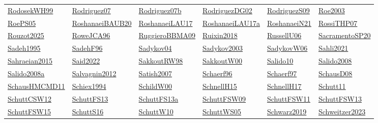\begin{longtable}{*{6}{l}}
\hyperref[detail:RodosekWH99]{RodosekWH99} & \hyperref[detail:Rodriguez07]{Rodriguez07} & \hyperref[detail:Rodriguez07b]{Rodriguez07b} & \hyperref[detail:RodriguezDG02]{RodriguezDG02} & \hyperref[detail:RodriguezS09]{RodriguezS09} & \hyperref[detail:Roe2003]{Roe2003}\\ 
\hyperref[detail:RoePS05]{RoePS05} & \hyperref[detail:RoshanaeiBAUB20]{RoshanaeiBAUB20} & \hyperref[detail:RoshanaeiLAU17]{RoshanaeiLAU17} & \hyperref[detail:RoshanaeiLAU17a]{RoshanaeiLAU17a} & \hyperref[detail:RoshanaeiN21]{RoshanaeiN21} & \hyperref[detail:RossiTHP07]{RossiTHP07}\\ 
\hyperref[detail:Rouzot2025]{Rouzot2025} & \hyperref[detail:RoweJCA96]{RoweJCA96} & \hyperref[detail:RuggieroBBMA09]{RuggieroBBMA09} & \hyperref[detail:Ruixin2018]{Ruixin2018} & \hyperref[detail:RussellU06]{RussellU06} & \hyperref[detail:SacramentoSP20]{SacramentoSP20}\\ 
\hyperref[detail:Sadeh1995]{Sadeh1995} & \hyperref[detail:SadehF96]{SadehF96} & \hyperref[detail:Sadykov04]{Sadykov04} & \hyperref[detail:Sadykov2003]{Sadykov2003} & \hyperref[detail:SadykovW06]{SadykovW06} & \hyperref[detail:Sahli2021]{Sahli2021}\\ 
\hyperref[detail:Sahraeian2015]{Sahraeian2015} & \hyperref[detail:Said2022]{Said2022} & \hyperref[detail:SakkoutRW98]{SakkoutRW98} & \hyperref[detail:SakkoutW00]{SakkoutW00} & \hyperref[detail:Salido10]{Salido10} & \hyperref[detail:Salido2008]{Salido2008}\\ 
\hyperref[detail:Salido2008a]{Salido2008a} & \hyperref[detail:Salvagnin2012]{Salvagnin2012} & \hyperref[detail:Satish2007]{Satish2007} & \hyperref[detail:Schaerf96]{Schaerf96} & \hyperref[detail:Schaerf97]{Schaerf97} & \hyperref[detail:SchausD08]{SchausD08}\\ 
\hyperref[detail:SchausHMCMD11]{SchausHMCMD11} & \hyperref[detail:Schiex1994]{Schiex1994} & \hyperref[detail:SchildW00]{SchildW00} & \hyperref[detail:SchnellH15]{SchnellH15} & \hyperref[detail:SchnellH17]{SchnellH17} & \hyperref[detail:Schutt11]{Schutt11}\\ 
\hyperref[detail:SchuttCSW12]{SchuttCSW12} & \hyperref[detail:SchuttFS13]{SchuttFS13} & \hyperref[detail:SchuttFS13a]{SchuttFS13a} & \hyperref[detail:SchuttFSW09]{SchuttFSW09} & \hyperref[detail:SchuttFSW11]{SchuttFSW11} & \hyperref[detail:SchuttFSW13]{SchuttFSW13}\\ 
\hyperref[detail:SchuttFSW15]{SchuttFSW15} & \hyperref[detail:SchuttS16]{SchuttS16} & \hyperref[detail:SchuttW10]{SchuttW10} & \hyperref[detail:SchuttWS05]{SchuttWS05} & \hyperref[detail:Schwarz2019]{Schwarz2019} & \hyperref[detail:Schweitzer2023]{Schweitzer2023}\\ 

\end{longtable}
